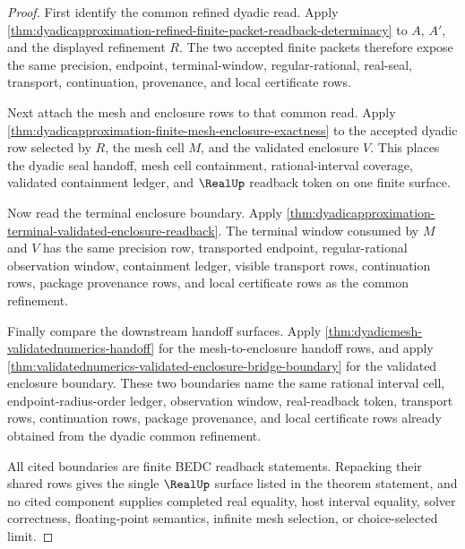 \begin{proof}
First identify the common refined dyadic read. Apply
\autoref{thm:dyadicapproximation-refined-finite-packet-readback-determinacy} to
$A$, $A'$, and the displayed refinement $R$. The two accepted finite packets
therefore expose the same precision, endpoint, terminal-window,
regular-rational, real-seal, transport, continuation, provenance, and local
certificate rows.

Next attach the mesh and enclosure rows to that common read. Apply
\autoref{thm:dyadicapproximation-finite-mesh-enclosure-exactness} to the
accepted dyadic row selected by $R$, the mesh cell $M$, and the validated
enclosure $V$. This places the dyadic seal handoff, mesh cell containment,
rational-interval coverage, validated containment ledger, and $\RealUp$
readback token on one finite surface.

Now read the terminal enclosure boundary. Apply
\autoref{thm:dyadicapproximation-terminal-validated-enclosure-readback}. The
terminal window consumed by $M$ and $V$ has the same precision row, transported
endpoint, regular-rational observation window, containment ledger, visible
transport rows, continuation rows, package provenance rows, and local
certificate rows as the common refinement.

Finally compare the downstream handoff surfaces. Apply
\autoref{thm:dyadicmesh-validatednumerics-handoff} for the mesh-to-enclosure
handoff rows, and apply
\autoref{thm:validatednumerics-validated-enclosure-bridge-boundary} for the
validated enclosure boundary. These two boundaries name the same rational
interval cell, endpoint-radius-order ledger, observation window, real-readback
token, transport rows, continuation rows, package provenance, and local
certificate rows already obtained from the dyadic common refinement.

All cited boundaries are finite BEDC readback statements. Repacking their
shared rows gives the single $\RealUp$ surface listed in the theorem statement,
and no cited component supplies completed real equality, host interval
equality, solver correctness, floating-point semantics, infinite mesh
selection, or choice-selected limit.
\end{proof}
